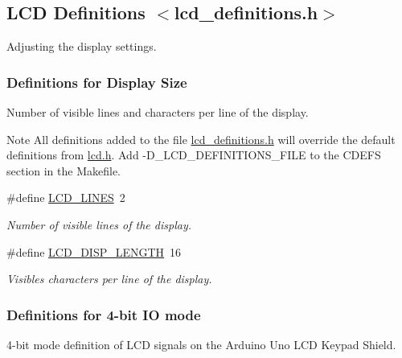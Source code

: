 \hypertarget{a00007}{}\subsection{L\+CD Definitions $<$lcd\+\_\+definitions.\+h$>$}
\label{a00007}


Adjusting the display settings.  


\subsubsection*{Definitions for Display Size}
\label{_amgrpcaec0cb1262819d89ffa7f25526cc869}%
Number of visible lines and characters per line of the display.

\begin{DoxyNote}{Note}
All definitions added to the file \hyperlink{a00003}{lcd\+\_\+definitions.\+h} will override the default definitions from \hyperlink{a00002}{lcd.\+h}. Add -\/\+D\+\_\+\+L\+C\+D\+\_\+\+D\+E\+F\+I\+N\+I\+T\+I\+O\+N\+S\+\_\+\+F\+I\+LE to the C\+D\+E\+FS section in the Makefile. 
\end{DoxyNote}
\begin{DoxyCompactItemize}
\item 
\#define \hyperlink{a00007_ga01212e90283511562039db786f65ba98}{L\+C\+D\+\_\+\+L\+I\+N\+ES}~2\hypertarget{a00007_ga01212e90283511562039db786f65ba98}{}\label{a00007_ga01212e90283511562039db786f65ba98}

\begin{DoxyCompactList}\small\item\em Number of visible lines of the display. \end{DoxyCompactList}\item 
\#define \hyperlink{a00007_ga684bb4392e384b7ae7c660d81dacb930}{L\+C\+D\+\_\+\+D\+I\+S\+P\+\_\+\+L\+E\+N\+G\+TH}~16\hypertarget{a00007_ga684bb4392e384b7ae7c660d81dacb930}{}\label{a00007_ga684bb4392e384b7ae7c660d81dacb930}

\begin{DoxyCompactList}\small\item\em Visibles characters per line of the display. \end{DoxyCompactList}\end{DoxyCompactItemize}
\subsubsection*{Definitions for 4-\/bit IO mode}
\label{_amgrp0d38ed8c5b4202f593f69f9003c1a16c}%
4-\/bit mode definition of L\+CD signals on the Arduino Uno L\+CD Keypad Shield.

